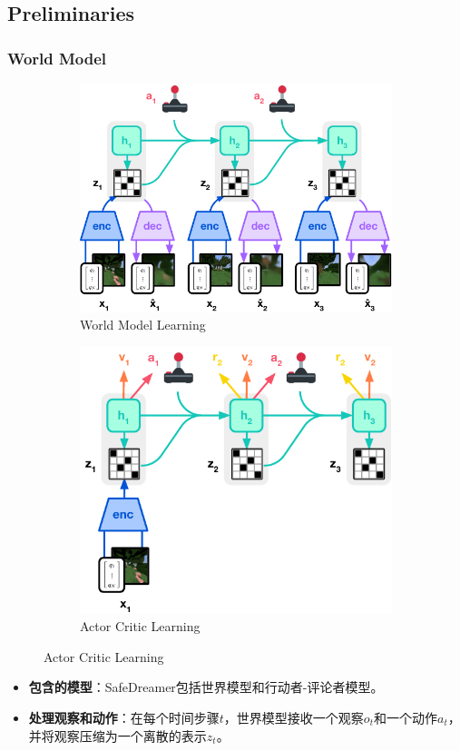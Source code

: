 \documentclass[10pt,mathserif]{beamer}%
\begin{document}
\subsection{Preliminaries}
\begin{frame}[t, fragile]
  \frametitle{World Model}
   \begin{figure}
\begin{subfigure}{.5\textwidth}
\includegraphics[width=0.75\linewidth]{images/model_wm.pdf}
\caption{World Model Learning}
\end{subfigure}
\begin{subfigure}{.43\textwidth}
\includegraphics[width=0.75\linewidth]{images/model_ac.pdf}
\caption{Actor Critic Learning}
\end{subfigure}
\label{fig:model}
\end{figure}
{
\fontsize{8pt}{9.6pt}\selectfont
\begin{itemize}
\item \textbf{包含的模型}：SafeDreamer包括世界模型和行动者-评论者模型。
\item \textbf{处理观察和动作}：在每个时间步骤$t$，世界模型接收一个观察$o_t$和一个动作$a_t$，并将观察压缩为一个离散的表示$z_t$。

\end{itemize}}
\end{frame}
\end{document}

